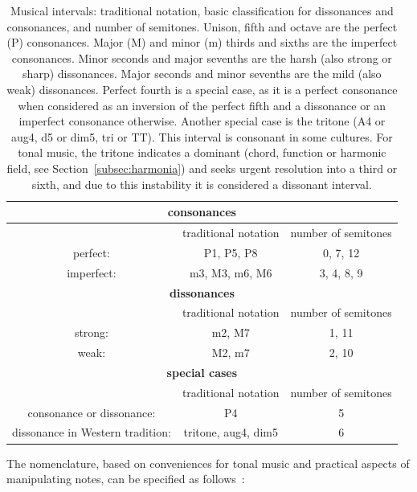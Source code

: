 \begin{table}[htp!]
\centering
    \caption{Musical intervals: traditional notation, basic classification for dissonances and consonances, and number of semitones. Unison, fifth and octave are the perfect (P) consonances. Major (M) and minor (m) thirds and sixths are the imperfect consonances. Minor seconds and major sevenths are the harsh (also strong or sharp) dissonances. Major seconds and minor sevenths are the mild (also weak) dissonances. Perfect fourth is a special case, as it is a perfect consonance when considered as an inversion of the perfect fifth and a dissonance or an imperfect consonance otherwise. Another special case is the tritone (A4 or aug4, d5 or dim5, tri or TT). This interval is consonant in some cultures.
	For tonal music, the tritone indicates a dominant (chord, function or harmonic field, see Section~\ref{subsec:harmonia}) and seeks urgent resolution into a third or sixth, and due to this instability it is considered a dissonant interval.}
\begin{tabular}{ c | c | c }\hline
    \multicolumn{3}{c}{\bf consonances}  \\\hline
   & traditional notation & number of semitones \\
   perfect: & P1, P5, P8 & 0, 7, 12 \\
 imperfect: & m3, M3, m6, M6 & 3, 4, 8, 9 \\\hline\hline
    \multicolumn{3}{c}{\bf dissonances} \\\hline
 & traditional notation & number of semitones \\
 strong: & m2, M7 & 1, 11 \\
 weak: & M2, m7 & 2, 10 \\\hline\hline
    \multicolumn{3}{c}{\bf special cases} \\\hline
 & traditional notation & number of semitones \\
 consonance or dissonance: & P4 & 5 \\
 dissonance in Western tradition: & tritone, aug4, dim5 & 6 \\\hline
\end{tabular}\label{eq:intervalos}
\end{table}

The nomenclature, based on conveniences for tonal music and practical aspects of manipulating notes, can be specified
as follows~\cite{Roederer,Wisnick}:

